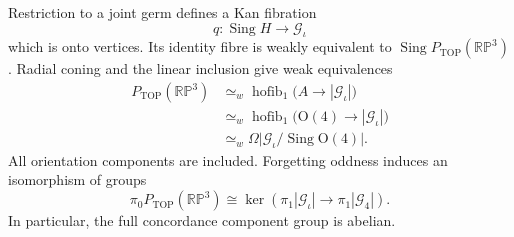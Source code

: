 \begin{theorem}\label{thm:projective-concordance-joint-germ}
Restriction to a joint germ defines a Kan fibration
\[
 q:\operatorname{Sing}H\longrightarrow\mathcal G_{\iota}
\]
which is onto vertices.  Its identity fibre is weakly equivalent
to $\operatorname{Sing}P_{\mathrm{TOP}}(\mathbb{RP}^3)$.
Radial coning and the linear inclusion give weak equivalences
\begin{equation}\label{eq:projective-concordance-germ-fibre}
 \begin{split}
 P_{\mathrm{TOP}}(\mathbb{RP}^3)
 &\simeq_w\operatorname{hofib}_1
       \bigl(A\longrightarrow|\mathcal G_{\iota}|\bigr)\\
 &\simeq_w\operatorname{hofib}_1
       \bigl(\mathrm O(4)\longrightarrow|\mathcal G_{\iota}|\bigr)\\
 &\simeq_w\Omega\bigl|\mathcal G_{\iota}/
                                   \operatorname{Sing}\mathrm O(4)\bigr|.
 \end{split}
\end{equation}
All orientation components are included.  Forgetting oddness
induces an isomorphism of groups
\begin{equation}\label{eq:projective-concordance-forgetful-kernel}
 \pi_0P_{\mathrm{TOP}}(\mathbb{RP}^3)
 \cong
 \ker\!\left(\pi_1|\mathcal G_{\iota}|
                 \longrightarrow\pi_1|\mathcal G_4|\right).
\end{equation}
In particular, the full concordance component group is abelian.
\end{theorem}


